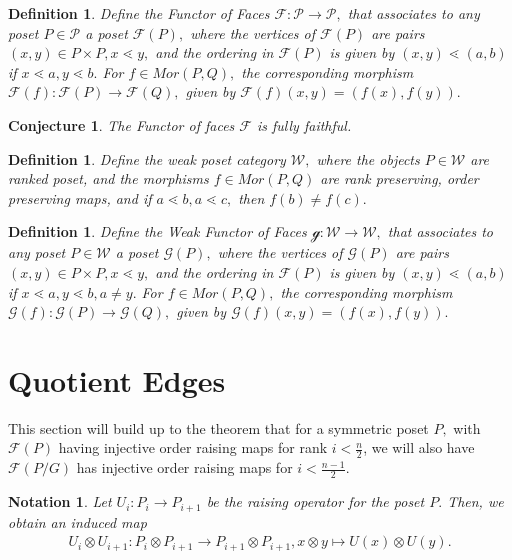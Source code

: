 \documentclass{amsart}
\newtheorem{conj}{Conjecture}
\newtheorem{defn}[subsubsection]{Definition}
\newtheorem{note}[subsubsection]{Notation}
\begin{document}
\begin{defn}
Define the {\it Functor of Faces} $\mathcal F:\mathcal P \rightarrow \mathcal P,$ that associates to any poset $P \in \mathcal P$ a poset $\mathcal F(P),$ where the vertices of $\mathcal F(P)$ are pairs $(x,y)\in P \times P,x \lessdot y,$ and the ordering in $\mathcal F(P)$ is given by $(x,y)\lessdot (a,b)$ if $x \lessdot a,y\lessdot b.$ For $f \in Mor(P,Q),$ the corresponding morphism $\mathcal F(f):\mathcal F(P) \rightarrow \mathcal F(Q),$ given by $\mathcal F(f)(x,y) = (f(x),f(y)).$
\end{defn}

\begin{conj}
The Functor of faces $\mathcal F$ is fully faithful.
\end{conj}

\begin{defn}
Define the {\it weak poset category} $\mathcal W,$ where the objects $P \in \mathcal W$ are ranked poset, and the morphisms $f\in Mor(P,Q)$ are rank preserving, order preserving maps, and if $a \lessdot b,a\lessdot c,$ then $f(b)\neq f(c).$
\end{defn}


\begin{defn}
Define the {\it Weak Functor of Faces} $\mathcal g:\mathcal W \rightarrow \mathcal W,$ that associates to any poset $P \in \mathcal W$ a poset $\mathcal G(P),$ where the vertices of $\mathcal G(P)$ are pairs $(x,y)\in P \times P,x \lessdot y,$ and the ordering in $\mathcal F(P)$ is given by $(x,y)\lessdot (a,b)$ if $x \lessdot a,y\lessdot b,a\neq y.$ For $f \in Mor(P,Q),$ the corresponding morphism $\mathcal G(f):\mathcal G(P) \rightarrow \mathcal G(Q),$ given by $\mathcal G(f)(x,y) = (f(x),f(y)).$
\end{defn}



\section{Quotient Edges}

This section will build up to the theorem that for a symmetric poset $P,$ with $\mathcal F(P)$ having injective order raising maps for rank $i < \frac{n}{2}$, we will also have $\mathcal F(P/G)$ has injective order raising maps for $i < \frac{n-1}{2}.$ 

\begin{note}
Let $U_i:P_i \rightarrow P_{i+1}$ be the raising operator for the poset $P.$ Then, we obtain an induced map
\begin{align*}
	U_i \otimes U_{i+1}:P_i\otimes P_{i+1} \rightarrow P_{i+1} \otimes P_{i+1},x \otimes y \mapsto U(x) \otimes U(y).
\end{align*}
\end{note}
\end{document}
